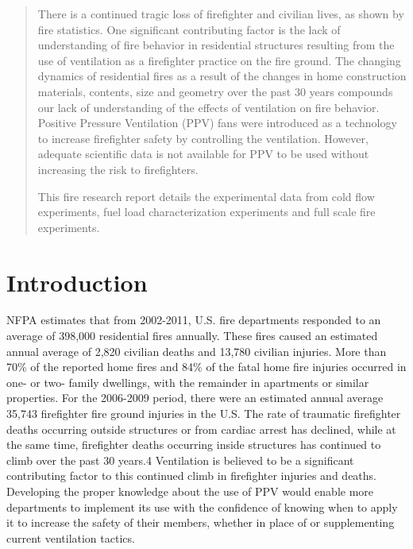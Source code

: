 \documentclass{article}
\begin{document}
\renewcommand{\abstractname}{Executive Summary}
\setlength{\emergencystretch}{5pt}

\begin{abstract}
There is a continued tragic loss of firefighter and civilian lives, as shown by fire statistics. One significant contributing factor is the lack of understanding of fire behavior in residential structures resulting from the use of ventilation as a firefighter practice on the fire ground. The changing dynamics of residential fires as a result of the changes in home construction materials, contents, size and geometry over the past 30 years compounds our lack of understanding of the effects of ventilation on fire behavior.  Positive Pressure Ventilation (PPV) fans were introduced as a technology to increase firefighter safety by controlling the ventilation.  However, adequate scientific data is not available for PPV to be used without increasing the risk to firefighters.

This fire research report details the experimental data from cold flow experiments, fuel load characterization experiments and full scale fire experiments. 
\end{abstract}

\newpage

\tableofcontents

\newpage

\section*{Introduction}
NFPA estimates that from 2002-2011, U.S. fire departments responded to an average of 398,000 residential fires annually. \cite{NFFF} These fires caused an estimated annual average of 2,820 civilian deaths and 13,780 civilian injuries. More than 70\% of the reported home fires and 84\% of the fatal home fire injuries occurred in one- or two- family dwellings, with the remainder in apartments or similar properties. For the 2006-2009 period, there were an estimated annual average 35,743 firefighter fire ground injuries in the U.S. The rate of traumatic firefighter deaths occurring outside structures or from cardiac arrest has declined, while at the same time, firefighter deaths occurring inside structures has continued to climb over the past 30 years.4 Ventilation is believed to be a significant contributing factor to this continued climb in firefighter injuries and deaths.  Developing the proper knowledge about the use of PPV would enable more departments to implement its use with the confidence of knowing when to apply it to increase the safety of their members, whether in place of or supplementing current ventilation tactics.
\end{document}
